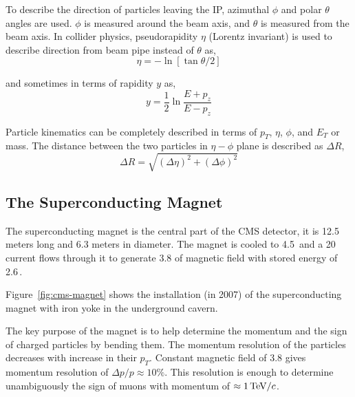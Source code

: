 To describe the direction of particles leaving the \gls{IP},
azimuthal \( \phi \) and polar \( \theta \) angles are used.
\( \phi \) is measured around the beam axis,
and \( \theta \) is measured from the beam axis.
In collider physics, pseudorapidity \( \eta \) (Lorentz invariant) is used
to describe direction from beam pipe instead of \( \theta \) as,
%
\begin{equation}
  \eta = - \ln[\tan{\theta/2}]
\end{equation}

and sometimes in terms of rapidity \( y \) as,
%
\begin{equation}
  y = \frac{1}{2} \ln{\frac{E+p_{z}}{E-p_{z}}}
\end{equation}

Particle kinematics can be completely described in terms of
\( p_{T} \), \( \eta \), \( \phi \), and \( E_{T} \) or mass.
The distance between the two particles in \( \eta - \phi \) plane
is described as \( \Delta R \),
%
\begin{equation}
  \Delta R = \sqrt{ {(\Delta \eta)}^{2} + {(\Delta \phi)}^{2} }
\end{equation}

\subsection{
  The Superconducting Magnet
}

The superconducting magnet is the central part of the \gls{CMS} detector, it is
12.5 meters long and 6.3 meters in diameter. The magnet is cooled to
4.5\,\xspace and a 20\,\xspace current flows through it to
generate 3.8\Tesla{} of magnetic field with stored energy of 2.6\,\xspace.

Figure~\ref{fig:cms-magnet} shows the
installation (in 2007) of the superconducting magnet with iron yoke in the underground
cavern.

The key purpose of the magnet is to help determine the momentum and the sign of charged
particles by bending them. The momentum resolution of the particles
decreases with increase in their \(p_T \). Constant magnetic field of 3.8\Tesla{}
gives momentum resolution of \(\Delta p /p \approx 10 \% \). This resolution
is enough to determine unambiguously the sign of muons with
momentum of \(\approx 1\,\text{Te\hspace{-.08em}V}{}/c \).

